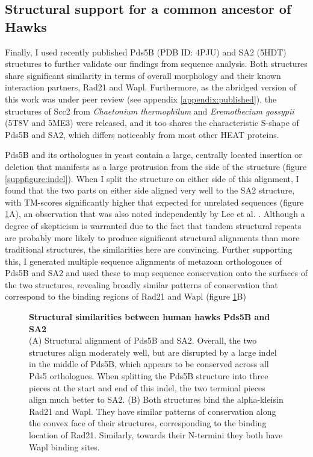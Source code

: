 \documentclass[a4paper,11pt,twoside,openright]{scrbook}
\begin{document}
\subsection{Structural support for a common ancestor of Hawks}
Finally, I used recently published Pds5B \cite{Ouyang2016} (PDB ID: 4PJU) and SA2 \cite{Hara2014} (5HDT) structures to further validate our findings from sequence analysis. Both structures share significant similarity in terms of overall morphology and their known interaction partners, Rad21 and Wapl. Furthermore, as the abridged version of this work was under peer review \cite{Wells2017} (see appendix \ref{appendix:published}), the structures of Scc2 from \textit{Chaetonium thermophilum} \cite{Kikuchi2016} and \textit{Eremothecium gossypii} \cite{Chao2017} (5T8V and 5ME3) were released, and it too shares the characteristic S-shape of Pds5B and SA2, which differs noticeably from most other HEAT proteins.

Pds5B and its orthologues in yeast contain a large, centrally located insertion or deletion that manifests as a large protrusion from the side of the structure (figure \ref{suppfigure:indel}). When I split the structure on either side of this alignment, I found that the two parts on either side aligned very well to the SA2 structure, with TM-scores significantly higher that expected for unrelated sequences (figure \ref{figure:smcstruc}A), an observation that was also noted independently by Lee et al. \cite{Lee2016}. Although a degree of skepticism is warranted due to the fact that tandem structural repeats are probably more likely to produce significant structural alignments than more traditional structures, the similarities here are convincing. Further supporting this, I generated multiple sequence alignments of metazoan orthologoues of Pds5B and SA2 and used these to map sequence conservation onto the surfaces of the two structures, revealing broadly similar patterns of conservation that correspond to the binding regions of Rad21 and Wapl (figure \ref{figure:smcstruc}B)

\begin{figure}[h]
    \caption[Structural similarities between human hawks Pds5B and SA2]{\sffamily \textbf{Structural similarities between human hawks Pds5B and SA2} \\ \small (A) Structural alignment of Pds5B and SA2. Overall, the two structures align moderately well, but are disrupted by a large indel in the middle of Pds5B, which appears to be conserved across all Pds5 orthologues. When splitting the Pds5B structure into three pieces at the start and end of this indel, the two terminal pieces align much better to SA2. (B) Both structures bind the alpha-kleisin Rad21 and Wapl. They have similar patterns of conservation along the convex face of their structures, corresponding to the binding location of Rad21. Similarly, towards their N-termini they both have Wapl binding sites.}
    \label{figure:smcstruc}
\end{figure}
\end{document}
